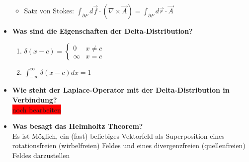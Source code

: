\documentclass[german]{latex4ei/latex4ei_sheet}
\begin{document}
\begin{itemize}
\begin{itemize}
				\item Satz von Stokes: $\int_{\partial F}d\vec{f}\cdot(\nabla\times\vec{A})=\int_{\partial F}d\vec{r}\cdot\vec{A}$
			\end{itemize}
		\item \textbf{Was sind die Eigenschaften der Delta-Distribution?}
			\begin{enumerate}
				\item $\delta(x-c)=
				\begin{cases}
					0 & x\neq c\\
					\infty & x=c
				\end{cases}$	
				\item $\int_{-\infty}^\infty\delta(x-c)dx=1$
			\end{enumerate}
		\item \textbf{Wie steht der Laplace-Operator mit der Delta-Distribution in Verbindung?}
		\\\colorbox{red}{noch bearbeiten}
		\item \textbf{Was besagt das Helmholtz Theorem?}\\
			Es ist Möglich, ein (fast) beliebiges Vektorfeld als Superposition eines rotationsfreien (wirbelfreien) Feldes und eines divergenzfreien (quellenfreien) Feldes darzustellen
\end{itemize}	
\end{document}

